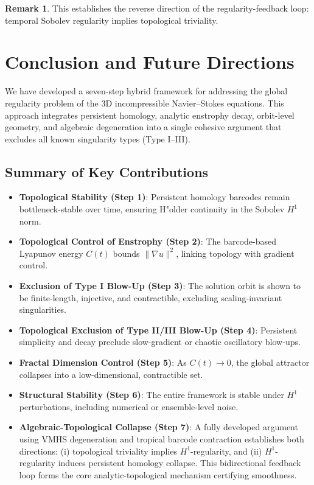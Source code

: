 \documentclass[11pt]{article}
\theoremstyle{definition}
\newtheorem{remark}[theorem]{Remark}
\begin{document}
\begin{remark}
This establishes the reverse direction of the regularity-feedback loop: temporal Sobolev regularity implies topological triviality.
\end{remark}




\section{Conclusion and Future Directions}

We have developed a seven-step hybrid framework for addressing the global regularity problem of the 3D incompressible Navier--Stokes equations. This approach integrates persistent homology, analytic enstrophy decay, orbit-level geometry, and algebraic degeneration into a single cohesive argument that excludes all known singularity types (Type I--III).

\subsection*{Summary of Key Contributions}

\begin{itemize}
    \item \textbf{Topological Stability (Step 1)}: Persistent homology barcodes remain bottleneck-stable over time, ensuring H"older continuity in the Sobolev $H^1$ norm.
    \item \textbf{Topological Control of Enstrophy (Step 2)}: The barcode-based Lyapunov energy $C(t)$ bounds $\|\nabla u\|^2$, linking topology with gradient control.
    \item \textbf{Exclusion of Type I Blow-Up (Step 3)}: The solution orbit is shown to be finite-length, injective, and contractible, excluding scaling-invariant singularities.
    \item \textbf{Topological Exclusion of Type II/III Blow-Up (Step 4)}: Persistent simplicity and decay preclude slow-gradient or chaotic oscillatory blow-ups.
    \item \textbf{Fractal Dimension Control (Step 5)}: As $C(t) \to 0$, the global attractor collapses into a low-dimensional, contractible set.
    \item \textbf{Structural Stability (Step 6)}: The entire framework is stable under $H^1$ perturbations, including numerical or ensemble-level noise.
    \item \textbf{Algebraic-Topological Collapse (Step 7)}: A fully developed argument using VMHS degeneration and tropical barcode contraction establishes both directions: (i) topological triviality implies $H^1$-regularity, and (ii) $H^1$-regularity induces persistent homology collapse. This bidirectional feedback loop forms the core analytic-topological mechanism certifying smoothness.
\end{itemize}
\end{document}
